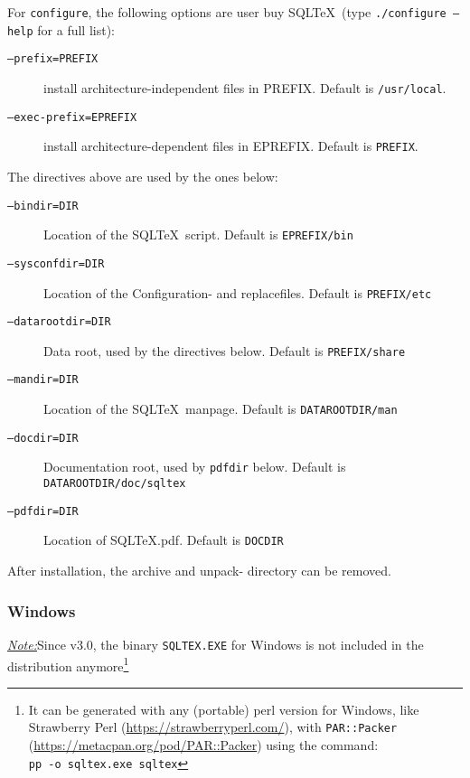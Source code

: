 \documentclass{article}
\newcommand{\vs}{\vspace{3mm}}
\begin{document}
For \texttt{configure}, the following options are user buy SQL\TeX\ (type \texttt{./configure --help} for a full list):

\begin{description}
\item[\texttt{--prefix=PREFIX}]         install architecture-independent files in PREFIX. Default is \texttt{/usr/local}.
\item[\texttt{--exec-prefix=EPREFIX}]   install architecture-dependent files in EPREFIX. Default is \texttt{PREFIX}.
\end{description}

The directives above are used by the ones below:

\begin{description}
\item[\texttt{--bindir=DIR}]            Location of the SQL\TeX\ script. Default is \texttt{EPREFIX/bin}
\item[\texttt{--sysconfdir=DIR}]        Location of the Configuration- and replacefiles. Default is \texttt{PREFIX/etc}
\item[\texttt{--datarootdir=DIR}]       Data root, used by  the directives below. Default is \texttt{PREFIX/share}
\item[\texttt{--mandir=DIR}]            Location of the SQL\TeX\ manpage. Default is \texttt{DATAROOTDIR/man}
\item[\texttt{--docdir=DIR}]            Documentation root, used by \texttt{pdfdir} below. Default is \texttt{DATAROOTDIR/doc/sqltex}
\item[\texttt{--pdfdir=DIR}]            Location of SQL\TeX.pdf. Default is \texttt{DOCDIR}
\end{description}

\vs

After installation, the archive and unpack- directory can be removed.

\subsubsection{Windows}

\noindent\hspace{-3mm}\textit{\underline{Note:}}Since v3.0, the binary \texttt{SQLTEX.EXE} for Windows is not included in the distribution anymore\footnote{ It can be generated with any (portable) perl version for Windows, like Strawberry Perl (\url{https://strawberryperl.com/}\label{winexe}), with \texttt{PAR::Packer} (\url{https://metacpan.org/pod/PAR::Packer}) using the command:\\
\texttt{pp -o sqltex.exe sqltex}}
\end{document}
